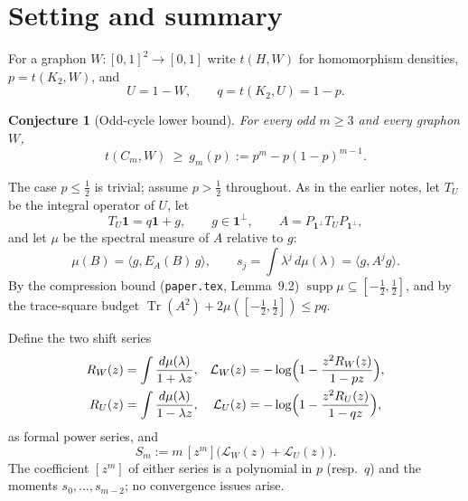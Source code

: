 \documentclass[11pt]{article}
\newtheorem{conjecture}[theorem]{Conjecture}
\newcommand{\one}{\mathbf 1}
\newcommand{\ip}[2]{\langle #1,#2\rangle}
\newcommand{\Tr}{\operatorname{Tr}}
\newcommand{\norm}[1]{\lVert #1\rVert}
\begin{document}
\begin{abstract}
For that remaining region the note proves a new \emph{aggregate forced-coupling lemma}: testing $U\ge0$ against $\phi^+\otimes\phi^-$ for a frontier eigenfunction $\phi$ gives
$a\ip{g}{|\phi|}\ge\alpha\norm{\phi^+}^2\norm{\phi^-}^2-qa^2-\tfrac12\norm{w^+}\norm{w^-}$,
which is sharp (up to a factor $2$) on the very family that falsifies the naive total-coupling bound, forces $\norm g_2^2\gtrsim(\alpha-q)/8$ there, and recovers the impossibility of balanced two-valued frontier modes.  The note also records that total-coupling forced coupling with the rank-one right-hand side is \emph{false} (explicit two-clique family with ratio $9s\to0$), and that the linear spectral shift is provably insufficient as $q\to1/2$.  The accompanying checker \texttt{two\_sided\_shift\_checker.py} verifies every identity and certificate exactly.
\end{abstract}

\tableofcontents

\section{Setting and summary}\label{sec:setting}

For a graphon $W:[0,1]^2\to[0,1]$ write $t(H,W)$ for homomorphism densities, $p=t(K_2,W)$, and
\[
        U=1-W,\qquad q=t(K_2,U)=1-p .
\]

\begin{conjecture}[Odd-cycle lower bound]\label{conj:main}
For every odd $m\ge3$ and every graphon $W$,
\[
        t(C_m,W)\ \ge\ g_m(p):=p^m-p(1-p)^{m-1}.
\]
\end{conjecture}

The case $p\le\frac12$ is trivial; assume $p>\frac12$ throughout.  As in the earlier notes, let $T_U$ be the integral operator of $U$, let
\[
        T_U\one=q\one+g,\qquad g\in\one^\perp,
        \qquad
        A=P_{\one^\perp}T_UP_{\one^\perp},
\]
and let $\mu$ be the spectral measure of $A$ relative to $g$:
\[
        \mu(B)=\ip{g}{E_A(B)\,g},
        \qquad
        s_j=\int\lambda^j\,d\mu(\lambda)=\ip{g}{A^jg}.
\]
By the compression bound (\texttt{paper.tex}, Lemma~9.2) $\operatorname{supp}\mu\subseteq[-\tfrac12,\tfrac12]$, and by the trace-square budget $\Tr(A^2)+2\mu([-\tfrac12,\tfrac12])\le pq$.

Define the two shift series
\begin{align}
        R_W(z)&=\int\frac{d\mu(\lambda)}{1+\lambda z},
        &
        \mathcal L_W(z)&=-\log\Bigl(1-\frac{z^2R_W(z)}{1-pz}\Bigr),
        \label{eq:LW}\\
        R_U(z)&=\int\frac{d\mu(\lambda)}{1-\lambda z},
        &
        \mathcal L_U(z)&=-\log\Bigl(1-\frac{z^2R_U(z)}{1-qz}\Bigr),
        \label{eq:LU}
\end{align}
as formal power series, and
\begin{equation}\label{eq:Sm}
        S_m := m\,[z^m]\bigl(\mathcal L_W(z)+\mathcal L_U(z)\bigr).
\end{equation}
The coefficient $[z^m]$ of either series is a polynomial in $p$ (resp.\ $q$) and the moments $s_0,\dots,s_{m-2}$; no convergence issues arise.
\end{document}
